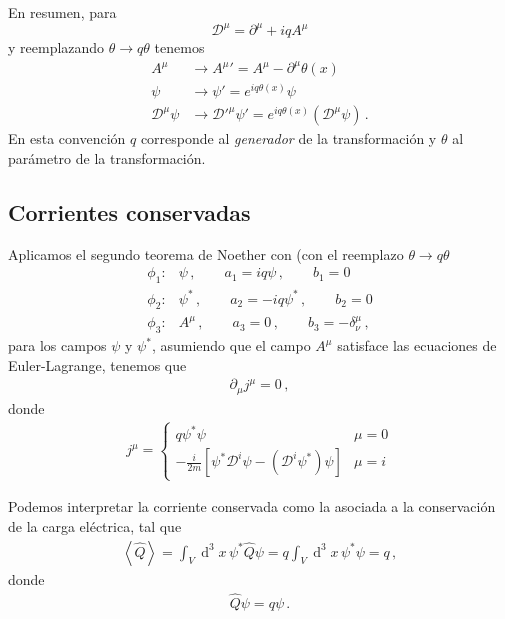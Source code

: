   En resumen, para 
\begin{equation}
  \mathcal{D}^\mu=\partial^\mu+iqA^\mu
\end{equation}
y reemplazando $\theta\to q\theta$ tenemos
\begin{align}
\label{eq:tfgl}
   A^\mu&\to{A^\mu}'=A^\mu-\partial^\mu\theta(x)\\
   \psi&\to \psi'=e^{iq\theta(x)}\psi\nonumber\\
  \mathcal{D}^\mu\psi&\to {\mathcal{D}'}^\mu\psi'=e^{iq\theta(x)}(\mathcal{D}^\mu\psi)\,.
\end{align}
En esta convención $q$ corresponde al \emph{generador} de la transformación y $\theta$ al parámetro de la transformación.


\subsection{Corrientes conservadas}
\label{ref:cc}
Aplicamos el segundo teorema de Noether con (con el reemplazo $\theta\to q\theta$
\begin{align}
\label{eq:dpa}
  \phi_{1}:& \psi\,,\qquad a_{1}=iq \psi \,,\qquad b_1=0\nonumber\\
  \phi_{2}:& \psi^{*}\,,\qquad a_{2}=-iq\psi^{*}\,,\qquad b_2=0 \nonumber\\
  \phi_{3}:& A^{\mu}\,,\qquad a_{3}=0\,,\qquad b_3=-\delta^{\mu}_{\nu}\,,
\end{align}
para los campos $\psi$ y $\psi^{*}$, asumiendo que el campo $A^{\mu}$ satisface las ecuaciones de Euler-Lagrange, tenemos que
\begin{align}
  \partial_{\mu}j^{\mu}=0\,,
\end{align}
donde
\begin{align}
  j^{\mu}=
  \begin{cases}
q \psi^{*}\psi & \mu=0\\
-\frac{i}{2m} \left[ \psi^{*}\mathcal{D}^i\psi-\left( \mathcal{D}^i\psi^{*} \right)\psi \right] & \mu=i
  \end{cases}
\end{align}

Podemos interpretar la corriente conservada como la asociada a la conservación de la carga eléctrica, tal que
\begin{align}
  \left\langle \widehat{Q} \right\rangle =\int_{V}\operatorname{d}^3x\, \psi^{*} \widehat{Q} \psi=q\int_{V}\operatorname{d}^3x\, \psi^{*} \psi=q\,,
\end{align}
donde
\begin{align}
  \widehat{Q} \psi=q\psi\,.
\end{align}


